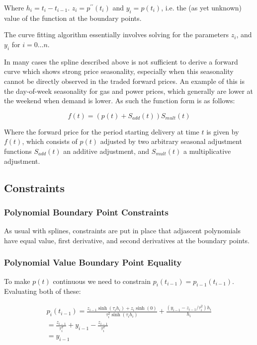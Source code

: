 \documentclass{article}
\begin{document}
Where $h_i =  t_i - t_{i-1}$. 
$z_i = p^{\prime \prime}(t_i)$ and $y_i = p(t_i)$, i.e. the (as yet unknown) value of the function at
the boundary points.

The curve fitting algorithm essentially involves solving for the parameters
$z_i$, and $y_i$ for $i=0 \hdots n$.

\bigskip
In many cases the spline described above is not sufficient to derive a forward curve which
shows strong price seasonality, especially when this seasonality cannot be directly observed
in the traded forward prices. An example of this is the day-of-week seasonality for gas and
power prices, which generally are lower at the weekend when demand is lower. As such the 
function form is as follows:

\begin{equation}
    \label{eq:foward_function}
    f(t) = (p(t) + S_{add}(t))S_{mult}(t)
\end{equation}

Where the forward price for the period starting delivery at time $t$ is given by $f(t)$, which 
consists of $p(t)$ adjusted by two arbitrary seasonal adjustment functions
$S_{add}(t)$ an additive adjustment, and $S_{mult}(t)$ a multiplicative adjustment.


\subsection{Constraints}
\subsubsection{Polynomial Boundary Point Constraints}
As usual with splines, constraints are put in place that adjascent polynomials 
have equal value, first derivative, and second derivatives at the boundary points.

\subsubsection{Polynomial Value Boundary Point Equality}
To make $p(t)$ continuous we need to constrain $p_i(t_{i-1}) = p_{i-1}(t_{i-1})$. Evaluating both
of these:

\begin{eqnarray}
    \nonumber
    p_i(t_{i-1}) = \frac{z_{i-1} \sinh(\tau_i h_i) + z_i \sinh(0)}{\tau_i^2 \sinh(\tau_i h_i)}
    + \frac{(y_{i-1} - z_{i-1}/\tau_i^2) h_i }{h_i} \\
    \nonumber
    = \frac{z_{i-1}}{\tau_i^2} + y_{i-1} - \frac{z_{i-1}}{\tau_i^2} \\
    = y_{i-1}
\end{eqnarray}
\end{document}
